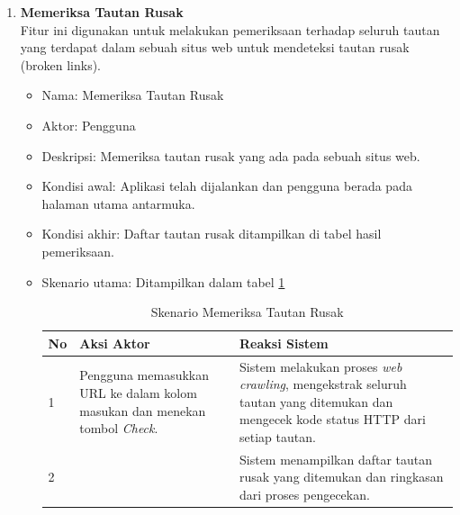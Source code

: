 \begin{enumerate}
    \item \textbf{Memeriksa Tautan Rusak}\\  
    Fitur ini digunakan untuk melakukan pemeriksaan terhadap seluruh tautan yang terdapat dalam sebuah situs web untuk mendeteksi tautan rusak (broken links).  
    
    \begin{itemize}
    
        \item Nama: Memeriksa Tautan Rusak
        
        \item Aktor: Pengguna
        
        \item Deskripsi: Memeriksa tautan rusak yang ada pada sebuah situs web.
        
        \item Kondisi awal: Aplikasi telah dijalankan dan pengguna berada pada halaman utama antarmuka.
        
        \item Kondisi akhir: Daftar tautan rusak ditampilkan di tabel hasil pemeriksaan.
        
        \item Skenario utama: Ditampilkan dalam tabel \ref{tab:skenario-01}
        \begin{table}[h]
            \centering
            \caption{Skenario Memeriksa Tautan Rusak}
            \vspace{6pt}
            \begin{tabular}{|p{0.5cm} |p{6cm}| p{6cm}|}\hline
                No & Aksi Aktor & Reaksi Sistem \\ \hline
                1 & Pengguna memasukkan URL ke dalam kolom masukan dan menekan tombol \textit{Check}. & Sistem melakukan proses \textit{web crawling}, mengekstrak seluruh tautan yang ditemukan dan mengecek kode status HTTP dari setiap tautan. \\ \hline
                2 & & Sistem menampilkan daftar tautan rusak yang ditemukan dan ringkasan dari proses pengecekan. \\ \hline
            \end{tabular}
            \label{tab:skenario-01}
        \end{table}

    \end{itemize}
    


\end{enumerate}
